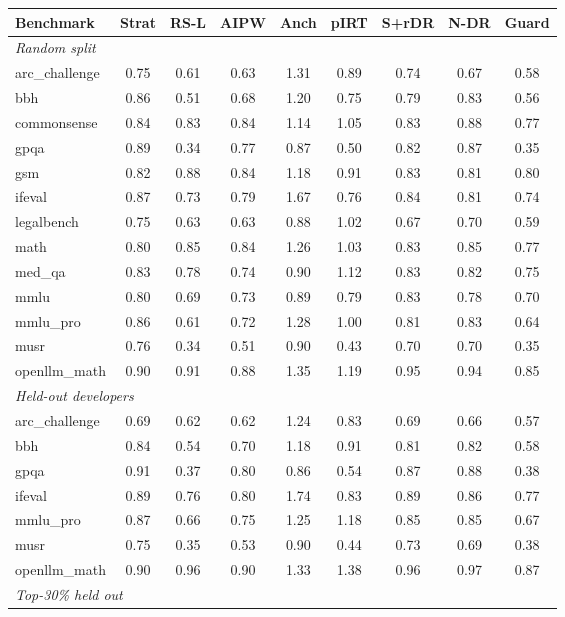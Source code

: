 \begin{tabular}{l cccccccc}
\toprule
Benchmark & Strat & RS-L & AIPW & Anch & pIRT & S+rDR & N-DR & Guard\\
\midrule
\multicolumn{9}{l}{\emph{Random split}}\\
arc\_challenge & 0.75 & 0.61 & 0.63 & 1.31 & 0.89 & 0.74 & 0.67 & 0.58 \\
bbh & 0.86 & 0.51 & 0.68 & 1.20 & 0.75 & 0.79 & 0.83 & 0.56 \\
commonsense & 0.84 & 0.83 & 0.84 & 1.14 & 1.05 & 0.83 & 0.88 & 0.77 \\
gpqa & 0.89 & 0.34 & 0.77 & 0.87 & 0.50 & 0.82 & 0.87 & 0.35 \\
gsm & 0.82 & 0.88 & 0.84 & 1.18 & 0.91 & 0.83 & 0.81 & 0.80 \\
ifeval & 0.87 & 0.73 & 0.79 & 1.67 & 0.76 & 0.84 & 0.81 & 0.74 \\
legalbench & 0.75 & 0.63 & 0.63 & 0.88 & 1.02 & 0.67 & 0.70 & 0.59 \\
math & 0.80 & 0.85 & 0.84 & 1.26 & 1.03 & 0.83 & 0.85 & 0.77 \\
med\_qa & 0.83 & 0.78 & 0.74 & 0.90 & 1.12 & 0.83 & 0.82 & 0.75 \\
mmlu & 0.80 & 0.69 & 0.73 & 0.89 & 0.79 & 0.83 & 0.78 & 0.70 \\
mmlu\_pro & 0.86 & 0.61 & 0.72 & 1.28 & 1.00 & 0.81 & 0.83 & 0.64 \\
musr & 0.76 & 0.34 & 0.51 & 0.90 & 0.43 & 0.70 & 0.70 & 0.35 \\
openllm\_math & 0.90 & 0.91 & 0.88 & 1.35 & 1.19 & 0.95 & 0.94 & 0.85 \\
\midrule
\multicolumn{9}{l}{\emph{Held-out developers}}\\
arc\_challenge & 0.69 & 0.62 & 0.62 & 1.24 & 0.83 & 0.69 & 0.66 & 0.57 \\
bbh & 0.84 & 0.54 & 0.70 & 1.18 & 0.91 & 0.81 & 0.82 & 0.58 \\
gpqa & 0.91 & 0.37 & 0.80 & 0.86 & 0.54 & 0.87 & 0.88 & 0.38 \\
ifeval & 0.89 & 0.76 & 0.80 & 1.74 & 0.83 & 0.89 & 0.86 & 0.77 \\
mmlu\_pro & 0.87 & 0.66 & 0.75 & 1.25 & 1.18 & 0.85 & 0.85 & 0.67 \\
musr & 0.75 & 0.35 & 0.53 & 0.90 & 0.44 & 0.73 & 0.69 & 0.38 \\
openllm\_math & 0.90 & 0.96 & 0.90 & 1.33 & 1.38 & 0.96 & 0.97 & 0.87 \\
\midrule
\multicolumn{9}{l}{\emph{Top-30\% held out}}\\

\end{tabular}

